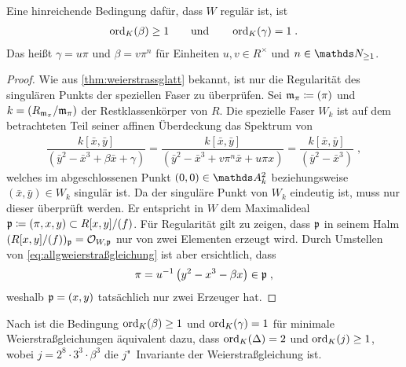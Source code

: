 \begin{Korollar}\label{thm:c1red}
  \label{bem:bedregweierstraßmodell}
  Eine hinreichende Bedingung dafür, dass $W$ regulär ist, ist
  \begin{gather*}
    \operatorname{ord}_{K}(\beta)\geq 1
    \qquad\text{und}\qquad
    \operatorname{ord}_{K}(\gamma)=1\;.
  \end{gather*}
  Das heißt $\gamma=u\pi$ und $\beta=v\pi^n$ für Einheiten
  $u,{v\in R^\times}$ und $n\in\N_{\geq1}$.

  \begin{proof}
    Wie aus \ref{thm:weierstrassglatt} bekannt, ist nur die
    Regularität des singulären Punkts der speziellen Faser zu
    überprüfen.
    Sei $\mathfrak{m}_\pi\coloneqq(\pi)$ und $k=(R_{\mathfrak{m}_\pi}/\mathfrak{m}_\pi)$ der
    Restklassenkörper von $R$.
    Die spezielle Faser $W_k$ ist auf dem betrachteten Teil seiner
    affinen Überdeckung das Spektrum von 
    \begin{gather*}
      \dfrac{k[\bar x,\bar y]}{(\bar y^2-\bar x^3+\beta \bar x+\gamma)}
      =\dfrac{k[\bar x,\bar y]}{(\bar y^2-\bar x^3+v\pi^n \bar x+u\pi x)}
      =\dfrac{k[\bar x,\bar y]}{(\bar y^2-\bar x^3)}\;,
    \end{gather*}
    welches im abgeschlossenen Punkt $(0,0)\in\A_k^2$ beziehungsweise
    $(\bar x,\bar y)\in W_k$ singulär ist. Da der singuläre Punkt von
    $W_k$ eindeutig ist, muss nur dieser überprüft werden.
    Er entspricht in $W$ dem Maximalideal
    $\mathfrak{p}\coloneqq(\pi,x,y)\subset R[x,y]/(f)$.
    Für Regularität gilt zu zeigen, dass $\mathfrak{p}$ in seinem Halm
    $(R[x,y]/(f))_{\mathfrak{p}}=\mathcal{O}_{W,\mathfrak{p}}$ nur von zwei Elementen erzeugt wird.
    Durch Umstellen von \eqref{eq:allgweierstraßgleichung} ist aber
    ersichtlich, dass
    \begin{gather*}
      \pi = u^{-1}\left( y^2-x^3-\beta x \right)\in\mathfrak{p}\;,
    \end{gather*}
    weshalb $\mathfrak{p}=(x,y)$ tatsächlich nur zwei Erzeuger hat.
  \end{proof}
\end{Korollar}

\begin{Bemerkung}
Nach \cite[Lemma~1.5/3 und~1.5/4]{neron} ist die
Bedingung $\operatorname{ord}_{K}(\beta)\geq 1$ und $\operatorname{ord}_{K}(\gamma)=1$ für
minimale Weierstraßgleichungen äquivalent dazu,
dass $\operatorname{ord}_{K}(\Delta)=2$ und $\operatorname{ord}_{K}(j)\geq 1$,
wobei $j=2^8\cdot 3^3\cdot\beta^3$ die $j$"~Invariante der
Weierstraßgleichung ist.
\end{Bemerkung}

